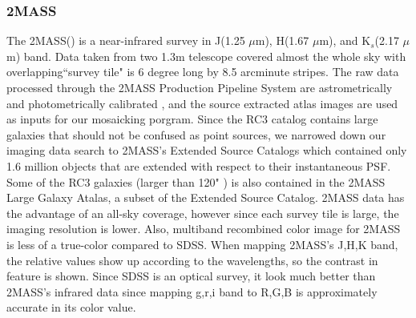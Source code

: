 \documentclass[5p]{elsarticle}
\begin{document}
	\subsubsection{2MASS}
	 The 2MASS(\citealp{2mass}) is a near-infrared survey in J(1.25 $\mu$m), H(1.67 $\mu$m), and K$_s$(2.17 $\mu$m) band. Data taken from two 1.3m telescope covered almost the whole sky with  overlapping``survey tile" is 6 degree long by 8.5 arcminute stripes.
 The raw data processed through the 2MASS Production Pipeline System are astrometrically and photometrically calibrated , and the source extracted atlas images are used as inputs for our mosaicking porgram. Since the RC3 catalog contains large galaxies that should not be confused as point sources, we narrowed down our imaging data search to 2MASS's Extended Source Catalogs which contained only 1.6 million objects that are extended with respect to their instantaneous PSF. Some of the RC3 galaxies (larger than 120" ) is also contained in the 2MASS Large Galaxy Atalas, a subset of the Extended Source Catalog.%
2MASS data has the advantage of an  all-sky coverage, however since each survey tile is large, the imaging resolution is lower. Also, multiband recombined color image for 2MASS is less of a true-color compared to SDSS. When mapping 2MASS's J,H,K band, the relative values show up according to the wavelengths, so the contrast in feature is shown. Since  SDSS is an optical survey, it look much better than 2MASS's infrared data since mapping g,r,i band to R,G,B is approximately accurate in its color value. 
\end{document}
